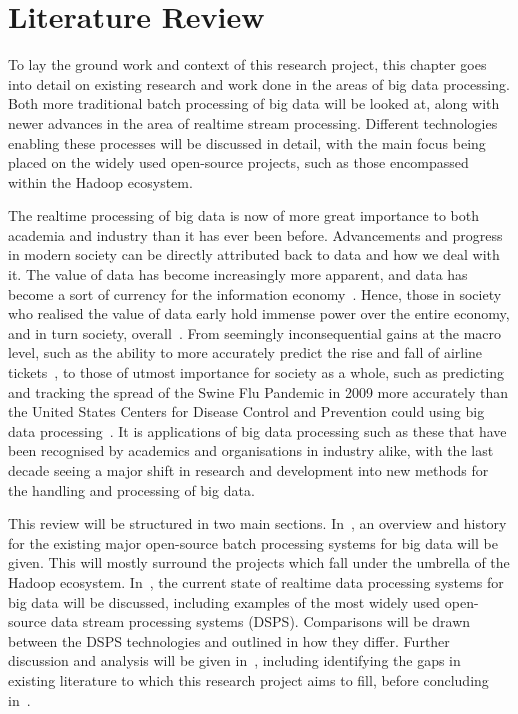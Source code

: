 \chapter{Literature Review}
\label{sec:litrev}

To lay the ground work and context of this research project, this chapter goes into detail on existing
research and work done in the areas of big data processing. Both more traditional batch processing of big
data will be looked at, along with newer advances in the area of realtime stream processing. Different
technologies enabling these processes will be discussed in detail, with the main focus being placed on the
widely used open-source projects, such as those encompassed within the Hadoop ecosystem.

The realtime processing of big data is now of more great importance to both academia and industry than it has
ever been before. Advancements and progress in modern society can be directly attributed back to data and
how we deal with it. The value of data has become increasingly more apparent, and data has become a sort of
currency for the information economy~\cite{st2009examining}. Hence, those in society who realised the value of
data early hold immense power over the entire economy, and in turn society,
overall~\cite{lievesley1993increasing}. From seemingly inconsequential gains at the macro level, such as the
ability to more accurately predict the rise and fall of airline tickets~\cite{darlin2006airfares}, to those
of utmost importance for society as a whole, such as predicting and tracking the spread of the Swine Flu
Pandemic in 2009 more accurately than the United States Centers for Disease Control and Prevention
could using big data processing~\cite{ritterman2009using,mayer2013big}. It is applications of big data
processing such as these that have been recognised by academics and organisations in industry alike, with the
last decade seeing a major shift in research and development into new methods for the handling
and processing of big data.

This review will be structured in two main sections.
In~, an overview and history for the existing major open-source batch
processing systems for big data will be given. This will mostly surround the projects which fall under the
umbrella of the Hadoop ecosystem. In~, the current state of realtime
data processing systems for big data will be discussed, including examples of the most widely used open-source
data stream processing systems (DSPS). Comparisons will be drawn between the DSPS technologies and outlined
in how they differ. Further discussion and analysis will be given in~,
including identifying the gaps in existing literature to which this research project aims to fill,
before concluding in~.

